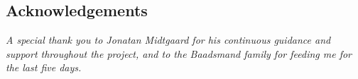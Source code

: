 \begin{center}
  \section*{Acknowledgements}
  \emph{A special thank you to Jonatan Midtgaard for his continuous guidance and support throughout the
    project, and to the Baadsmand family for feeding me for the last five days.}
\end{center}
\restoregeometry
